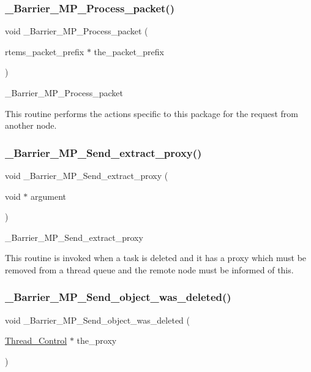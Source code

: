 \subsubsection{\texorpdfstring{\_Barrier\_MP\_Process\_packet()}{\_Barrier\_MP\_Process\_packet()}}
{\footnotesize\ttfamily void \+\_\+\+Barrier\+\_\+\+M\+P\+\_\+\+Process\+\_\+packet (\begin{DoxyParamCaption}\item[{rtems\+\_\+packet\+\_\+prefix $\ast$}]{the\+\_\+packet\+\_\+prefix }\end{DoxyParamCaption})}



\+\_\+\+Barrier\+\_\+\+M\+P\+\_\+\+Process\+\_\+packet 

This routine performs the actions specific to this package for the request from another node. \mbox{\label{group__ClassicBarrierMP_gacdbb9342c4bf1026fc73c55ae3bd14f0}} 
\subsubsection{\texorpdfstring{\_Barrier\_MP\_Send\_extract\_proxy()}{\_Barrier\_MP\_Send\_extract\_proxy()}}
{\footnotesize\ttfamily void \+\_\+\+Barrier\+\_\+\+M\+P\+\_\+\+Send\+\_\+extract\+\_\+proxy (\begin{DoxyParamCaption}\item[{void $\ast$}]{argument }\end{DoxyParamCaption})}



\+\_\+\+Barrier\+\_\+\+M\+P\+\_\+\+Send\+\_\+extract\+\_\+proxy 

This routine is invoked when a task is deleted and it has a proxy which must be removed from a thread queue and the remote node must be informed of this. \mbox{\label{group__ClassicBarrierMP_gae19b67a9cc104a4800d8d1d87f7b33a6}} 
\subsubsection{\texorpdfstring{\_Barrier\_MP\_Send\_object\_was\_deleted()}{\_Barrier\_MP\_Send\_object\_was\_deleted()}}
{\footnotesize\ttfamily void \+\_\+\+Barrier\+\_\+\+M\+P\+\_\+\+Send\+\_\+object\+\_\+was\+\_\+deleted (\begin{DoxyParamCaption}\item[{\mbox{\hyperlink{struct__Thread__Control}{Thread\+\_\+\+Control}} $\ast$}]{the\+\_\+proxy }\end{DoxyParamCaption})}



